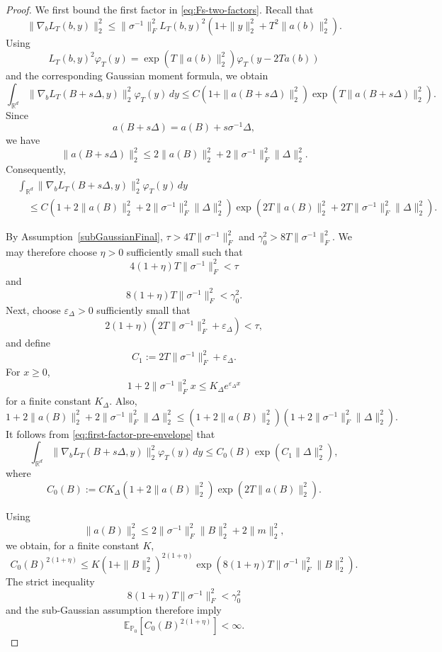 \documentclass[10pt,a4paper]{amsart}
\newcommand{\E}{\mathbb{E}}
\newcommand{\R}{\mathbb{R}}
\begin{document}
\begin{proof}
We first bound the first factor in \eqref{eq:Fs-two-factors}. Recall that
\[
\|\nabla_bL_T(b,y)\|_2^2
\leq
\|\sigma^{-1}\|_F^2
L_T(b,y)^2
\left(
1+\|y\|_2^2+T^2\|a(b)\|_2^2
\right).
\]
Using
\[
L_T(b,y)^2\varphi_T(y)
=
\exp\!\left(T\|a(b)\|_2^2\right)
\varphi_T(y-2Ta(b))
\]
and the corresponding Gaussian moment formula, we obtain
\[
\int_{\R^d}
\|\nabla_bL_T(B+s\Delta,y)\|_2^2
\varphi_T(y)\,dy
\leq
C
\left(
1+\|a(B+s\Delta)\|_2^2
\right)
\exp\!\left(
T\|a(B+s\Delta)\|_2^2
\right).
\]
Since
\[
a(B+s\Delta)=a(B)+s\sigma^{-1}\Delta,
\]
we have
\[
\|a(B+s\Delta)\|_2^2
\leq
2\|a(B)\|_2^2
+
2\|\sigma^{-1}\|_F^2\|\Delta\|_2^2.
\]
Consequently,
\begin{align}
&\int_{\R^d}
\|\nabla_bL_T(B+s\Delta,y)\|_2^2
\varphi_T(y)\,dy \nonumber\\
&\quad\leq
C
\left(
1+2\|a(B)\|_2^2
+2\|\sigma^{-1}\|_F^2\|\Delta\|_2^2
\right)
\exp\!\left(
2T\|a(B)\|_2^2
+2T\|\sigma^{-1}\|_F^2\|\Delta\|_2^2
\right).
\label{eq:first-factor-pre-envelope}
\end{align}

By Assumption~\ref{subGaussianFinal}, $\tau>4T\|\sigma^{-1}\|_F^2$ and $\gamma_0^2>8T\|\sigma^{-1}\|_F^2.$
We may therefore choose $\eta>0$ sufficiently small such that
\[
4(1+\eta)T\|\sigma^{-1}\|_F^2<\tau
\]
and
\[
8(1+\eta)T\|\sigma^{-1}\|_F^2<\gamma_0^2.
\]
Next, choose $\varepsilon_\Delta>0$ sufficiently small that
\[
2(1+\eta)
\left(
2T\|\sigma^{-1}\|_F^2+\varepsilon_\Delta
\right)
<\tau,
\]
and define
\[
C_1
:=
2T\|\sigma^{-1}\|_F^2+\varepsilon_\Delta.
\]
For $x\geq0$,
\[
1+2\|\sigma^{-1}\|_F^2x
\leq
K_\Delta e^{\varepsilon_\Delta x}
\]
for a finite constant $K_\Delta$. Also,
\[
1+2\|a(B)\|_2^2
+2\|\sigma^{-1}\|_F^2\|\Delta\|_2^2
\leq
\left(
1+2\|a(B)\|_2^2
\right)
\left(
1+2\|\sigma^{-1}\|_F^2\|\Delta\|_2^2
\right).
\]
It follows from \eqref{eq:first-factor-pre-envelope} that
\begin{equation}\label{eq:first-factor-envelope}
\int_{\R^d}
\|\nabla_bL_T(B+s\Delta,y)\|_2^2
\varphi_T(y)\,dy
\leq
C_0(B)
\exp\!\left(C_1\|\Delta\|_2^2\right),
\end{equation}
where
\[
C_0(B)
:=
CK_\Delta
\left(
1+2\|a(B)\|_2^2
\right)
\exp\!\left(
2T\|a(B)\|_2^2
\right).
\]

Using
\[
\|a(B)\|_2^2
\leq
2\|\sigma^{-1}\|_F^2\|B\|_2^2
+2\|m\|_2^2,
\]
we obtain, for a finite constant $K$,
\[
C_0(B)^{2(1+\eta)}
\leq
K
\left(
1+\|B\|_2^2
\right)^{2(1+\eta)}
\exp\!\left(
8(1+\eta)T
\|\sigma^{-1}\|_F^2
\|B\|_2^2
\right).
\]
The strict inequality
\[
8(1+\eta)T\|\sigma^{-1}\|_F^2<\gamma_0^2
\]
and the sub-Gaussian assumption therefore imply
\begin{equation}\label{eq:C0-moment}
\E_{\mathbb P_0}
\left[
C_0(B)^{2(1+\eta)}
\right]
<\infty.
\end{equation}


\end{proof}
\end{document}
